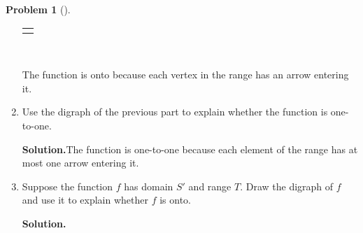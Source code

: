 \documentclass[10pt,]{book}
\theoremstyle{plain}
\theoremstyle{definition}
\newtheorem{activity}[project]{Problem}
\theoremstyle{definition}
\numberwithin{equation}{chapter}
\newlength{\panelmax}
\begin{document}
\begin{activity}[]
\begin{enumerate}[font=\bfseries,label=(\alph*),ref=\alph*]
{{{{
}
}}
\newlength{\phAXimage}\setlength{\phAXimage}{\ht\panelboxAXimage+\dp\panelboxAXimage}
\settototalheight{\phAXimage}{\usebox{\panelboxAXimage}}
\setlength{\panelmax}{\maxof{\panelmax}{\phAXimage}}
\leavevmode%
\setlength{\tabcolsep}{0\linewidth}
\par\medskip\noindent
\hspace*{0.35\linewidth}%
\begin{tabular}{@{}*{1}{c}@{}}
\begin{minipage}[c][\panelmax][t]{0.3\linewidth}\usebox{\panelboxAXimage}\end{minipage}\end{tabular}\\
}%
\par
The function is onto because each vertex in the range has an arrow entering it.%
\item\label{task-247} Use the digraph of the previous part to explain whether the function is one-to-one.%
\par\medskip\noindent%
\textbf{Solution.}\quad The function is one-to-one because each element of the range has at most one arrow entering it.%
\item\label{task-248} Suppose the function \(f\) has domain \(S'\) and range \(T\).  Draw the digraph of \(f\) and use it to explain whether \(f\) is onto.%
\par\medskip\noindent%
\textbf{Solution.}\quad %
{%
\setlength{\panelmax}{0pt}
\newsavebox{\panelboxAYimage}
}
\end{enumerate}
\end{activity}
\end{document}
